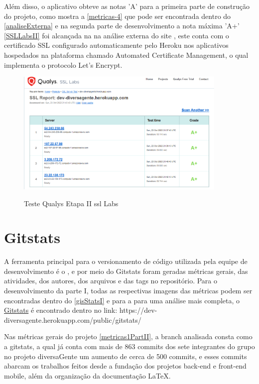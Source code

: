 Além disso, o aplicativo obteve as notas 'A' para a primeira parte de construção do projeto, como mostra a \autoref{metricas-4} que pode ser encontrada dentro do \autoref{analiseExterna} e na segunda parte de desenvolvimento a nota máxima 'A+' \autoref{SSLLabsII} foi alcançada na   na análise externa do site , este conta com o certificado SSL configurado automaticamente pelo Heroku nos aplicativos hospedados na plataforma chamado Automated Certificate Management, o qual implementa o protocolo Let’s Encrypt.

\begin{figure}[h]
	\centering
	\caption{\label{fig_arq_virado}Teste Qualys Etapa II \ac{ssl} Labs}
	\includegraphics[width=0.90\textwidth]{anexos/SSLlabsII.png}
	\label{SSLLabsII}
\end{figure}

\pagebreak

\section{Gitstats}

A ferramenta principal para o versionamento de código utilizada pela equipe de desenvolvimento é o , e por meio do Gitstats foram geradas métricas gerais, das atividades, dos autores, dos arquivos e das tags no repositório. Para o desenvolvimento da parte I, todas as respectivas imagens das métricas podem ser encontradas dentro do \autoref{gisStatsI} e para a para uma análise mais completa, o 
\href{https://dev-diversagente.herokuapp.com/public/gitstats/}{Gitstats} é encontrado dentro no link: https://dev-diversagente.herokuapp.com/public/gitstats/


Nas métricas gerais do projeto \autoref{metricas1PartII}, a branch analisada consta como a gitstats, a qual já conta com mais de 863 commits dos sete integrantes do grupo no projeto diversaGente um aumento de cerca de 500 commits, e esses commits abarcam os trabalhos feitos desde a fundação dos projetos back-end e front-end mobile, além da organização da documentação LaTeX. 

